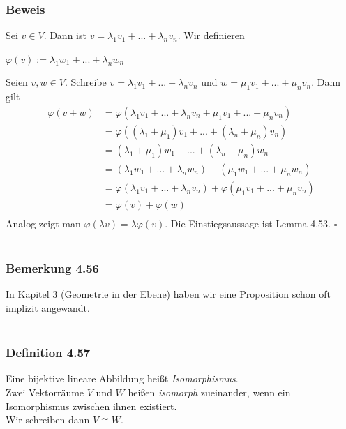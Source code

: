 \documentclass{article}
\begin{document}
\subsubsection*{Beweis}
Sei $v \in V$. Dann ist $v = \lambda_1 v_1 + ... + \lambda_n v_n$. Wir definieren \\
\begin{center}
    $\varphi(v) := \lambda_1 w_1 + ... + \lambda_n w_n$ \\
\end{center}
Seien $v, w \in V$. Schreibe $v = \lambda_1 v_1 + ... + \lambda_n v_n$ und $w = \mu_1 v_1 + ... + \mu_n v_n$. Dann gilt \\
\begin{align*}
    \varphi(v + w) &= \varphi(\lambda_1 v_1 + ... + \lambda_n v_n + \mu_1 v_1 + ... + \mu_n v_n) \\
    &= \varphi((\lambda_1 + \mu_1) v_1 + ... + (\lambda_n + \mu_n) v_n) \\
    &= (\lambda_1 + \mu_1) w_1 + ... + (\lambda_n + \mu_n) w_n \\
    &= (\lambda_1 w_1 + ... + \lambda_n w_n) + (\mu_1 w_1 + ... + \mu_n w_n) \\
    &= \varphi(\lambda_1 v_1 + ... + \lambda_n v_n) + \varphi(\mu_1 v_1 + ... + \mu_n v_n) \\
    &= \varphi(v) + \varphi(w) \\
\end{align*}
Analog zeigt man $\varphi(\lambda v) = \lambda \varphi(v)$. Die Einstiegsaussage ist Lemma 4.53. $\square$ \\
\\
\subsubsection*{Bemerkung 4.56}
In Kapitel 3 (Geometrie in der Ebene) haben wir eine Proposition schon oft implizit angewandt. \\
\\
\subsubsection*{Definition 4.57}
Eine bijektive lineare Abbildung heißt \textit{Isomorphismus}. \\
Zwei Vektorräume $V$ und $W$ heißen \textit{isomorph} zueinander, wenn ein Isomorphismus zwischen ihnen existiert. \\
Wir schreiben dann $V \cong W$. \\
\\
\end{document}
